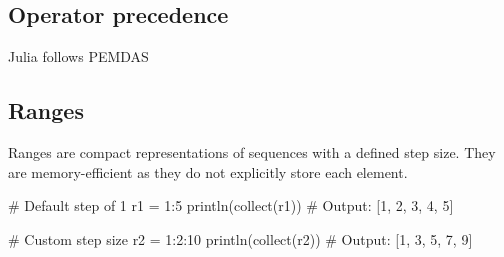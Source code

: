 \documentclass{report}
\begin{document}
    \subsection{Operator precedence}
    \bigbreak \noindent 
    Julia follows PEMDAS
    \bigbreak \noindent 

    \bigbreak \noindent 
    \subsection{Ranges}
    \bigbreak \noindent 
    Ranges are compact representations of sequences with a defined step size. They are memory-efficient as they do not explicitly store each element.
    \bigbreak \noindent 
    \begin{jlcode}
        # Default step of 1
        r1 = 1:5
        println(collect(r1))  # Output: [1, 2, 3, 4, 5]

        # Custom step size
        r2 = 1:2:10
        println(collect(r2))  # Output: [1, 3, 5, 7, 9]
    \end{jlcode}

    \bigbreak \noindent 
\end{document}

